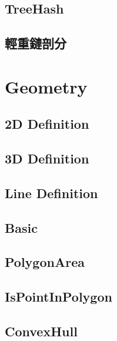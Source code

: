 \subsection{TreeHash}


\subsection{輕重鏈剖分}

\section{Geometry}

\subsection{2D Definition}


\subsection{3D Definition}


\subsection{Line Definition}


\subsection{Basic}


\subsection{PolygonArea}


\subsection{IsPointInPolygon}


\subsection{ConvexHull}


